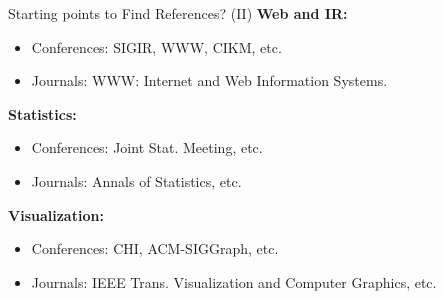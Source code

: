 \begin{frame}{Starting points to Find References? (II)}
	\textbf{Web and IR:}
	\begin{itemize}
		\item Conferences: SIGIR, WWW, CIKM, etc.
		\item Journals: WWW: Internet and Web Information Systems.
	\end{itemize}
	\textbf{Statistics:}
	\begin{itemize}
		\item Conferences: Joint Stat. Meeting, etc.
		\item Journals: Annals of Statistics, etc.
	\end{itemize}
	\textbf{Visualization:}
	\begin{itemize}
		\item Conferences: CHI, ACM-SIGGraph, etc.
		\item Journals: IEEE Trans. Visualization and Computer Graphics, etc.
	\end{itemize}
\end{frame}
